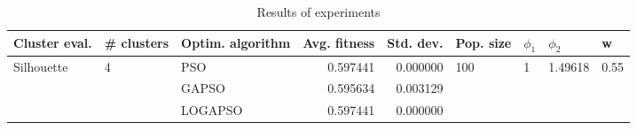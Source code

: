 \begin{table}
\centering
\caption{Results of experiments}
\begin{tabular}{lllrrllll}
\toprule
              Cluster eval. &        \# clusters & Optim. algorithm &  Avg. fitness &  Std. dev. &            Pop. size &         $\phi_{1}$ &               $\phi_{2}$ &                     w \\
\midrule
\multirow{3}{*}{Silhouette} & \multirow{3}{*}{4} &              PSO &      0.597441 &   0.000000 & \multirow{3}{*}{100} & \multirow{3}{*}{1} & \multirow{3}{*}{1.49618} & \multirow{3}{*}{0.55} \\
                            &                    &            GAPSO &      0.595634 &   0.003129 &                      &                    &                          &                       \\
                            &                    &          LOGAPSO &      0.597441 &   0.000000 &                      &                    &                          &                       \\
\bottomrule
\end{tabular}
\end{table}
